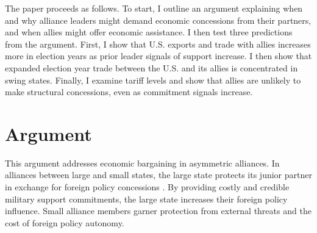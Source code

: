 \documentclass[12pt]{article}
\begin{document}
The paper proceeds as follows. 
To start, I outline an argument explaining when and why alliance leaders might demand economic concessions from their partners, and when allies might offer economic assistance. 
I then test three predictions from the argument. 
First, I show that U.S. exports and trade with allies increases more in election years as prior leader signals of support increase. 
I then show that expanded election year trade between the U.S. and its allies is concentrated in swing states. 
Finally, I examine tariff levels and show that allies are unlikely to make structural concessions, even as commitment signals increase. 


\section{Argument}


%
%
%


This argument addresses economic bargaining in asymmetric alliances. 
In alliances between large and small states, the large state protects its junior partner in exchange for foreign policy concessions \citep{Morrow1991}.
By providing costly and credible military support commitments, the large state increases their foreign policy influence. 
Small alliance members garner protection from external threats and the cost of foreign policy autonomy. 
\end{document}
